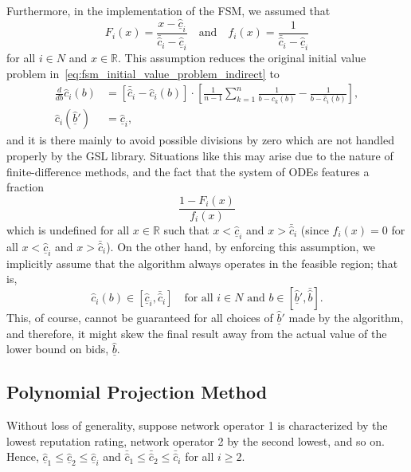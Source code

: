 Furthermore, in the implementation of the FSM, we assumed that
\begin{equation*}
  F_i(x) = \frac{x - \underline{\hat{c}}_i}{\bar{\hat{c}}_i - \underline{\hat{c}}_i} \quad\textrm{and}\quad f_i(x) = \frac{1}{\bar{\hat{c}}_i - \underline{\hat{c}}_i}
\end{equation*}
for all $i\in N$ and $x\in\mathbb{R}$. This assumption reduces the original initial value problem in~\eqref{eq:fsm_initial_value_problem_indirect} to
\begin{equation*}
  \begin{array}{ll}
    \displaystyle\frac{d}{db}\hat{c}_i(b) &= \displaystyle\left[ \bar{\hat{c}}_i - \hat{c}_i(b)\right]\cdot\left[ \frac{1}{n-1}\sum_{k=1}^n\frac{1}{b - \hat{c}_k(b)} - \frac{1}{b - \hat{c}_i(b)} \right], \\[2ex]
    \hat{c}_i(\underline{\hat{b}}') &= \underline{\hat{c}}_i,
  \end{array}
\end{equation*}
and it is there mainly to avoid possible divisions by zero which are not handled properly by the GSL library. Situations like this may arise due to the nature of finite-difference methods, and the fact that the system of ODEs features a fraction
\begin{equation*}
  \frac{1 - F_i(x)}{f_i(x)}
\end{equation*}
which is undefined for all $x\in\mathbb{R}$ such that $x < \underline{\hat{c}}_i$ and $x > \bar{\hat{c}}_i$ (since $f_i(x) = 0$ for all $x < \underline{\hat{c}}_i$ and $x > \bar{\hat{c}}_i$). On the other hand, by enforcing this assumption, we implicitly assume that the algorithm always operates in the feasible region; that is,
\begin{equation*}
  \hat{c}_i(b)\in [\underline{\hat{c}}_i, \bar{\hat{c}}_i] \quad\textrm{for all } i\in N \textrm{ and } b\in\left[\underline{\hat{b}}', \bar{\hat{b}}\right].
\end{equation*}
This, of course, cannot be guaranteed for all choices of $\underline{\hat{b}}'$ made by the algorithm, and therefore, it might skew the final result away from the actual value of the lower bound on bids, $\underline{\hat{b}}$.

\subsection{Polynomial Projection Method} %
\label{sub:polynomial_projection_method_indirect}
Without loss of generality, suppose network operator 1 is characterized by the lowest reputation rating, network operator 2 by the second lowest, and so on. Hence, $\underline{\hat{c}}_1\leq \underline{\hat{c}}_2\leq \underline{\hat{c}}_i$ and $\bar{\hat{c}}_1\leq \bar{\hat{c}}_2\leq \bar{\hat{c}}_i$ for all $i\geq 2$.

